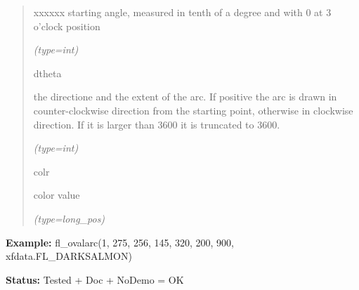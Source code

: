 \begin{boxedminipage}{\funcwidth}
\begin{quote}
\begin{Ventry}{xxxxxx}
          starting angle, measured in tenth of a degree and with 0 at 3 
          o'clock position

            {\it (type=int)}

          \item[dtheta]

          the directione and the extent of the arc. If positive the arc is 
          drawn in counter-clockwise direction from the starting point, 
          otherwise in clockwise direction. If it is larger than 3600 it is
          truncated to 3600.

            {\it (type=int)}

          \item[colr]

          color value

            {\it (type=long\_pos)}

        \end{Ventry}

      \end{quote}

\textbf{Example:} fl\_ovalarc(1, 275, 256, 145, 320, 200, 900, xfdata.FL\_DARKSALMON)



\textbf{Status:} Tested + Doc + NoDemo = OK



    \end{boxedminipage}

    \label{xformslib:flxbasic:fl_ovalf}

    \vspace{0.5ex}

